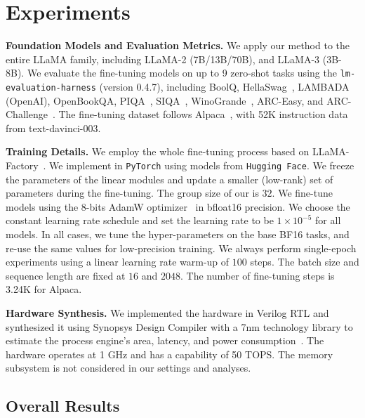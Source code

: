 \section{Experiments}
\label{sec:exp}



\noindent\textbf{Foundation Models and Evaluation Metrics.} We apply our method to the entire LLaMA family, including LLaMA-2 (7B/13B/70B)\citep{touvron2023llama2}, and LLaMA-3 (3B-8B). We evaluate the fine-tuning models on up to 9 zero-shot tasks using the \texttt{lm-evaluation-harness} (version 0.4.7)\citep{eval-harness}, including BoolQ\citep{clark2019boolq}, HellaSwag~\citep{zellers2019hellaswag}, LAMBADA (OpenAI)\citep{radford2019language}, OpenBookQA\citep{OpenBookQA2018}, PIQA~\citep{bisk2020piqa}, SIQA~\citep{sap2019socialiqa}, WinoGrande~\citep{sakaguchi2019winogrande}, ARC-Easy, and ARC-Challenge~\citep{clark2018think}. The fine-tuning dataset follows Alpaca~\citep{alpaca}, with 52K instruction data from text-davinci-003. 

\noindent\textbf{Training Details.} We employ the whole fine-tuning process based on LLaMA-Factory~\citep{zheng2024llamafactory}. 
We implement \methodname{} in \texttt{PyTorch} using models from \texttt{Hugging Face}. We freeze the parameters of the linear modules and update a smaller (low-rank) set of parameters during the fine-tuning. The group size of our \methodname{} is $32$. We fine-tune models using the 8-bits AdamW optimizer~\citep{dettmers8} in bfloat16 precision. We choose the constant learning rate schedule and set the learning rate to be $1\times10^{-5}$ for all models. In all cases, we tune the hyper-parameters on the base BF16 tasks, and re-use the same values for low-precision training. We always perform single-epoch experiments using a linear learning rate warm-up of $100$ steps. The batch size and sequence length are fixed at $16$ and $2048$. The number of fine-tuning steps is 3.24K for Alpaca. 

\noindent\textbf{Hardware Synthesis.} We implemented the hardware in Verilog RTL and synthesized it using Synopsys Design Compiler with a 7nm technology library to estimate the process engine's area, latency, and power consumption~\citep{clark2016asap7}. The hardware operates at 1 GHz and has a capability of 50 TOPS. The memory subsystem is not considered in our settings and analyses.

\subsection{Overall Results}\label{subsec_overall_res}
